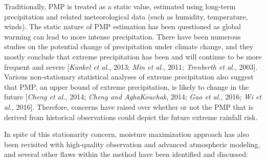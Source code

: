 Traditionally, PMP is treated as a static value, estimated using long-term precipitation and related meteorological data (such as humidity, temperature, winds). The static nature of PMP estimation has been questioned as global warming can lead to more intense precipitation. There have been numerous studies on the potential change of precipitation under climate change, and they mostly conclude that extreme precipitation has been and will continue to be more frequent and severe [\textit{Kunkel et al.}, 2013; \textit{Min et al.}, 2011; \textit{Trenberth et al.}, 2003]. Various non-stationary statistical analyses of extreme precipitation also suggest that PMP, an upper bound of extreme precipitation, is likely to change in the future [\textit{Cheng et al.}, 2014; \textit{Cheng and AghaKouchak}, 2014; \textit{Gao et al.}, 2016; \textit{Wi et al.}, 2016]. Therefore, concerns have raised over whether or not the PMP that is derived from historical observations could depict the future extreme rainfall risk.
 
In spite of this stationarity concern, moisture maximization approach has also been revisited with high-quality observation and advanced atmospheric modeling, and several other flaws within the method have been identified and discussed:

